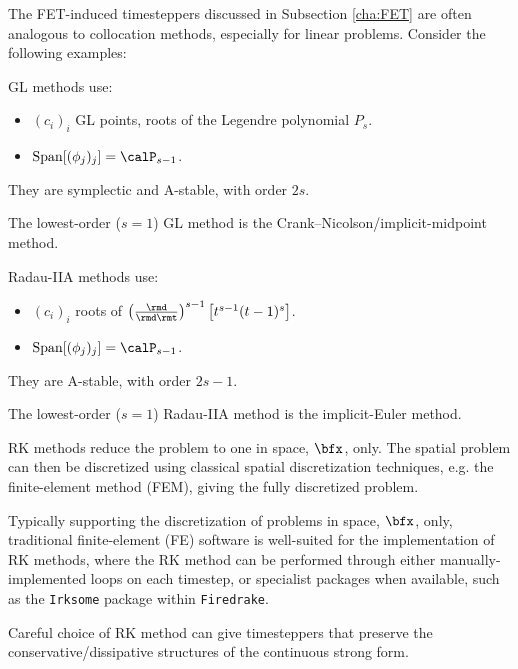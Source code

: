    The FET-induced timesteppers discussed in Subsection \ref{cha:FET} are often analogous to collocation methods, especially for linear problems. Consider the following examples:

    \begin{example}
        GL methods use:
        \begin{itemize}
            \item  $(c_{i})_{i}$ GL points, roots of the Legendre polynomial $P_{s}$.
            \item  ${\rm Span}[(\phi_{j})_{j}]  =  \calP_{s - 1}$.
        \end{itemize}
        They are symplectic and A-stable, with order $2s$. \BA{[Ref]}

        The lowest-order ($s  =  1$) GL method is the Crank--Nicolson/implicit-midpoint method.
    \end{example}

    \begin{example}
        Radau-IIA methods use:
        \begin{itemize}
            \item  $(c_{i})_{i}$ roots of $\left(\frac{\rmd}{\rmd\rmt}\right)^{s - 1}\left[t^{s - 1}(t - 1)^{s}\right]$.
            \item  ${\rm Span}[(\phi_{j})_{j}]  =  \calP_{s - 1}$.
        \end{itemize}
        They are A-stable, with order $2s - 1$. \BA{[Ref]}

        The lowest-order ($s  =  1$) Radau-IIA method is the implicit-Euler method.
    \end{example}
    
    \line
    
    RK methods reduce the problem to one in space, $\bfx$, only. The spatial problem can then be discretized using classical spatial discretization techniques, e.g. the finite-element method (FEM), giving the fully discretized problem.
    
    Typically supporting the discretization of problems in space, $\bfx$, only, traditional finite-element (FE) software is well-suited for the implementation of RK methods, where the RK method can be performed through either manually-implemented loops on each timestep, or specialist packages when available, such as the \texttt{Irksome} package within \texttt{Firedrake}. \cite{Farrell_Kirby_Marchena-Menéndez_2021}

    Careful choice of RK method can give timesteppers that preserve the conservative/dissipative structures of the continuous strong form.

